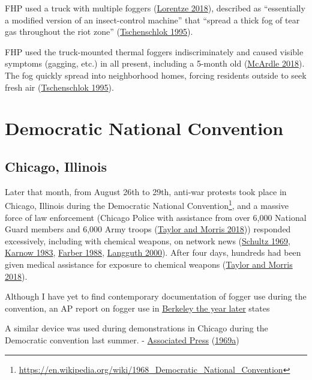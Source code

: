 \documentclass[
  11pt,
]{krantz}
\renewenvironment{quote}{\begin{VF}}{\end{VF}}
\renewcommand{\href}[2]{#2\footnote{\url{#1}}}
\begin{document}
FHP used a truck with multiple foggers (\protect\hyperlink{ref-Lorentzen2018}{Lorentze 2018}), described as ``essentially a modified version of an insect-control machine'' that ``spread a thick fog of tear gas throughout the riot zone'' (\protect\hyperlink{ref-Tschenschlok1995}{Tschenschlok 1995}).

FHP used the truck-mounted thermal foggers indiscriminately and caused visible symptoms (gagging, etc.) in all present, including a 5-month old (\protect\hyperlink{ref-McArdle2018}{McArdle 2018}).
The fog quickly spread into neighborhood homes, forcing residents outside to seek fresh air (\protect\hyperlink{ref-Tschenschlok1995}{Tschenschlok 1995}).

\hypertarget{democratic-national-convention}{%
\section{Democratic National Convention}\label{democratic-national-convention}}

\hypertarget{ChicagoIL1968_08_26}{%
\subsection{Chicago, Illinois}\label{ChicagoIL1968_08_26}}

Later that month, from August 26th to 29th, anti-war protests took place in Chicago, Illinois during the \href{https://en.wikipedia.org/wiki/1968_Democratic_National_Convention}{Democratic National Convention}, and a massive force of law enforcement (Chicago Police with assistance from over 6,000 National Guard members and 6,000 Army troops (\protect\hyperlink{ref-TaylorandMorris2018}{Taylor and Morris 2018})) responded excessively, including with chemical weapons, on network news (\protect\hyperlink{ref-Schultz1969}{Schultz 1969}, \protect\hyperlink{ref-Karnow1983}{Karnow 1983}, \protect\hyperlink{ref-Farber1988}{Farber 1988}, \protect\hyperlink{ref-Langguth2000}{Langguth 2000}).
After four days, hundreds had been given medical assistance for exposure to chemical weapons (\protect\hyperlink{ref-TaylorandMorris2018}{Taylor and Morris 2018}).

Although I have yet to find contemporary documentation of fogger use during the convention, an AP report on fogger use in \protect\hyperlink{BerkeleyCA1969_02_21}{Berkeley the year later} states

\begin{quote}
A similar device was used during demonstrations in Chicago during the Democratic convention last summer. - \protect\hyperlink{ref-TheDailyTribune1969_02_21}{Associated Press} (\protect\hyperlink{ref-TheDailyTribune1969_02_21}{1969a})
\end{quote}
\end{document}
